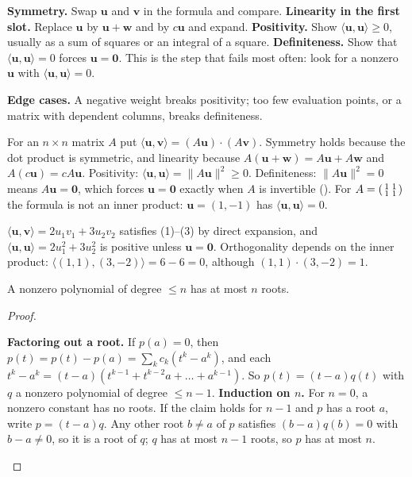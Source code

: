\documentclass[10pt]{scrartcl}
\newcommand{\vv}[1]{\mathbf{#1}}
\newcommand{\ip}[2]{\langle #1,#2\rangle}
\newenvironment{howto}[1]{\begin{mdframed}[style=howtostyle,frametitle={#1}]}{\end{mdframed}}
\begin{document}
\begin{howto}{How to check that a formula is an inner product}
  \begin{steps}
    \ii \textbf{Symmetry.} Swap $\vv u$ and $\vv v$ in the formula and compare.
    \ii \textbf{Linearity in the first slot.} Replace $\vv u$ by $\vv u+\vv w$ and by $c\vv u$ and expand.
    \ii \textbf{Positivity.} Show $\ip{\vv u}{\vv u}\ge 0$, usually as a sum of squares or an integral of a square.
    \ii \textbf{Definiteness.} Show that $\ip{\vv u}{\vv u}=0$ forces $\vv u=\vv 0$. This is the step that fails most often: look for a nonzero $\vv u$ with $\ip{\vv u}{\vv u}=0$.
  \end{steps}
  \textbf{Edge cases.} A negative weight breaks positivity; too few evaluation points, or a matrix with dependent columns, breaks definiteness.
\end{howto}

\begin{example*}[The inner product $(A\vv u)\cdot(A\vv v)$]
  For an $n\times n$ matrix $A$ put $\ip{\vv u}{\vv v}=(A\vv u)\cdot(A\vv v)$. Symmetry holds because the dot product is symmetric, and linearity because $A(\vv u+\vv w)=A\vv u+A\vv w$ and $A(c\vv u)=cA\vv u$. Positivity: $\ip{\vv u}{\vv u}=\|A\vv u\|^2\ge 0$. Definiteness: $\|A\vv u\|^2=0$ means $A\vv u=\vv 0$, which forces $\vv u=\vv 0$ exactly when $A$ is invertible (). For $A=\begin{psmallmatrix}1&1\\1&1\end{psmallmatrix}$ the formula is not an inner product: $\vv u=(1,-1)$ has $\ip{\vv u}{\vv u}=0$.
\end{example*}

\begin{example*}
  $\ip{\vv u}{\vv v}=2u_1v_1+3u_2v_2$ satisfies (1)--(3) by direct expansion, and $\ip{\vv u}{\vv u}=2u_1^2+3u_2^2$ is positive unless $\vv u=\vv 0$. Orthogonality depends on the inner product: $\ip{(1,1)}{(3,-2)}=6-6=0$, although $(1,1)\cdot(3,-2)=1$.
\end{example*}

\begin{proposition*}
  A nonzero polynomial of degree $\le n$ has at most $n$ roots.
\end{proposition*}
\begin{proof}
  \begin{steps}
    \ii \textbf{Factoring out a root.} If $p(a)=0$, then $p(t)=p(t)-p(a)=\sum_kc_k(t^k-a^k)$, and each $t^k-a^k=(t-a)(t^{k-1}+t^{k-2}a+\dots+a^{k-1})$. So $p(t)=(t-a)q(t)$ with $q$ a nonzero polynomial of degree $\le n-1$.
    \ii \textbf{Induction on $n$.} For $n=0$, a nonzero constant has no roots. If the claim holds for $n-1$ and $p$ has a root $a$, write $p=(t-a)q$. Any other root $b\neq a$ of $p$ satisfies $(b-a)q(b)=0$ with $b-a\neq 0$, so it is a root of $q$; $q$ has at most $n-1$ roots, so $p$ has at most $n$. \qedhere
  \end{steps}
\end{proof}
\end{document}
